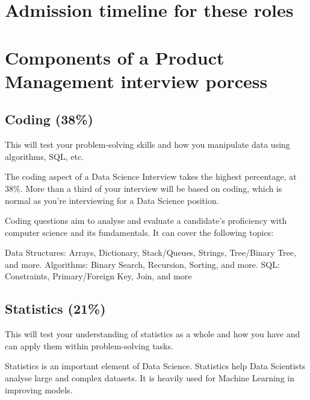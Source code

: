 \documentclass[
]{book}
\begin{document}
\hypertarget{admission-timeline-for-these-roles-1}{%
\section*{Admission timeline for these roles}\label{admission-timeline-for-these-roles-1}}

\hypertarget{components-of-a-product-management-interview-porcess}{%
\section*{Components of a Product Management interview porcess}\label{components-of-a-product-management-interview-porcess}}

\hypertarget{coding-38-1}{%
\subsection{Coding (38\%)}\label{coding-38-1}}

This will test your problem-solving skills and how you manipulate data using algorithms, SQL, etc.

The coding aspect of a Data Science Interview takes the highest percentage, at 38\%. More than a third of your interview will be based on coding, which is normal as you're interviewing for a Data Science position.

Coding questions aim to analyse and evaluate a candidate's proficiency with computer science and its fundamentals. It can cover the following topics:

Data Structures: Arrays, Dictionary, Stack/Queues, Strings, Tree/Binary Tree, and more.
Algorithms: Binary Search, Recursion, Sorting, and more.
SQL: Constraints, Primary/Foreign Key, Join, and more

\hypertarget{statistics-21-1}{%
\subsection{Statistics (21\%)}\label{statistics-21-1}}

This will test your understanding of statistics as a whole and how you have and can apply them within problem-solving tasks.

Statistics is an important element of Data Science. Statistics help Data Scientists analyse large and complex datasets. It is heavily used for Machine Learning in improving models.
\end{document}
